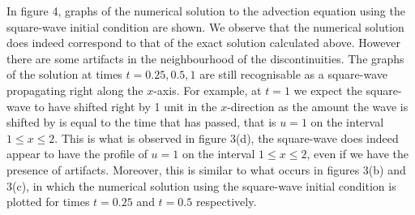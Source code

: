 \documentclass[a4paper, 12pt]{article}
\begin{document}
In figure 4, graphs of the numerical solution to the advection equation using the square-wave initial condition are shown. We observe that the numerical solution does indeed correspond to that of the exact solution calculated above. However there are some artifacts in the neighbourhood of the discontinuities. The graphs of the solution at times $t=0.25,0.5,1$ are still recognisable as a square-wave propagating right along the $x$-axis. For example, at $t=1$ we expect the square-wave to have shifted right by 1 unit in the $x$-direction as the amount the wave is shifted by is equal to the time that has passed, that is $u=1$ on the interval $1\leq x \leq 2$. This is what is observed in figure 3(d), the square-wave does indeed appear to have the profile of $u=1$ on the interval $1\leq x \leq 2$, even if we have the presence of artifacts. Moreover, this is similar to what occurs in figures 3(b) and 3(c), in which the numerical solution using the square-wave initial condition is plotted for times $t=0.25$ and $t=0.5$ respectively.\\ 
 
\end{document}
